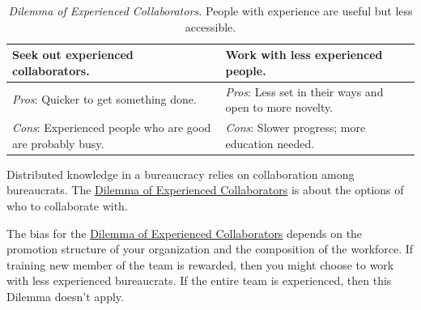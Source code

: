 \begin{center}
\begin{table}[H] %
\begin{tabular}{ | m{\dilemmatablewidth}| m{\dilemmatablewidth} | } 
  \hline
  \textbf{Seek out experienced collaborators.} & 
  \textbf{Work with less experienced people.} \\ 
  \hline
  \textit{Pros}: Quicker to get something done. &
  \textit{Pros}: Less set in their ways and open to more novelty. \\  
  \hline
  \textit{Cons}: Experienced people who are good are probably busy. &
  \textit{Cons}: Slower progress; more education needed. \\  
  \hline
\end{tabular}
\caption{
\textit{Dilemma of Experienced Collaborators.}
People with experience are useful but less accessible.
}
\label{table:dilemma-personal-experienced-collaborators}
\end{table}
\end{center}


Distributed knowledge in a bureaucracy relies on collaboration among bureaucrats. 
The \hyperref[table:dilemma-personal-experienced-collaborators]{Dilemma of Experienced Collaborators} is about the options of who to collaborate with. 


The bias for the \hyperref[table:dilemma-personal-experienced-collaborators]{Dilemma of Experienced Collaborators} depends on the promotion structure of your organization and the composition of the workforce. If training new member of the team is rewarded, then you might choose to work with less experienced bureaucrats. If the entire team is experienced, then this Dilemma doesn't apply.

